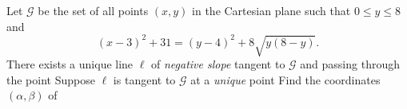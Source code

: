 Let $\mathcal{G}$ be the set of all points $(x,y)$ in the Cartesian plane such that $0\le y\le 8$ and $$(x-3)^2+31=(y-4)^2+8\sqrt{y(8-y)}.$$There exists a unique line $\ell$ of \textit{negative slope} tangent to $\mathcal{G}$ and passing through the point  Suppose $\ell$ is tangent to $\mathcal{G}$ at a \textit{unique} point  Find the coordinates $(\alpha, \beta)$ of 
